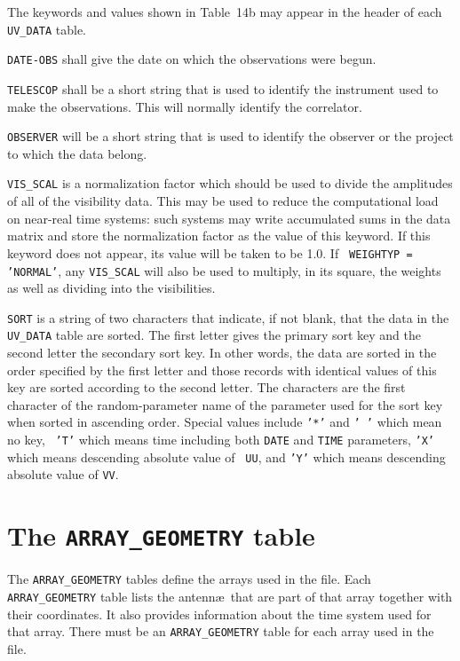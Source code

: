 \documentclass[twoside]{article}
\newcommand{\Hi}[1]{\textcolor{hicol}{#1}}
\newcommand{\Me}[1]{\textcolor{mecol}{#1}}
\begin{document}
\Me{The keywords and values shown in Table~14b may appear in the
  header of each {\tt UV\_DATA} table.}

\Hi{{\tt DATE-OBS} shall give the date on which the observations were
begun.}

\Hi{{\tt TELESCOP}} shall be a short string that is used to identify
the instrument used to make the observations.  This will normally
identify the correlator.

\Hi{{\tt OBSERVER}} will be a short string that is used to identify
the observer or the project to which the data belong.

\Hi{{\tt VIS\_SCAL}} is a normalization factor which should be used to
divide the amplitudes of all of the visibility data.  This may be used
to reduce the computational load on near-real time systems: such
systems may write accumulated sums in the data matrix and store the
normalization factor as the value of this keyword.  \Me{If this
  keyword does not appear, its value will be taken to be 1.0.  If {\tt
    WEIGHTYP = 'NORMAL'}, any {\tt VIS\_SCAL} will also be used to
  multiply, in its square, the weights as well as dividing into the
  visibilities.}

\Hi{{\tt SORT}} is a string of two characters that indicate\Hi{, if not
blank,} that the data in the {\tt UV\_DATA} table are sorted.  The
first letter gives the primary sort key and the second letter the
secondary sort key.  In other words, the data are sorted in the order
specified by the first letter and those records with identical values
of this key are sorted according to the second letter.  \Hi{The
characters are the first character of the random-parameter name of
the parameter used for the sort key when sorted in ascending order.
Special values include {\tt '*'} and {\tt ' '} which mean no key, {\tt
'T'} which means time including both {\tt DATE} and {\tt TIME}
parameters, {\tt 'X'} which means descending absolute value of {\tt
UU}, and {\tt 'Y'} which means descending absolute value of {\tt VV}.}

\section{The {\tt ARRAY\_GEOMETRY} table}
\label{s:AG}

The {\tt ARRAY\_GEOMETRY} tables define the arrays used in the file.
Each {\tt ARRAY\_GEOMETRY} table lists the antenn\ae\ that are part of
that array together with their coordinates.  It also provides
information about the time system used for that array.  \Hi{There must
be an {\tt ARRAY\_GEOMETRY} table for each array used in the file.}
\vfill\eject
\end{document}
